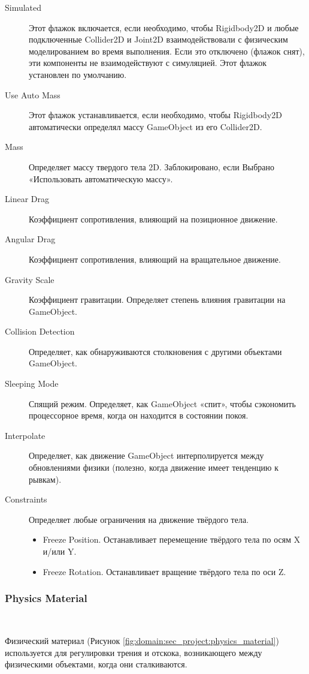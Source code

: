 \begin{description}
	\item[Simulated] Этот флажок включается, если необходимо, чтобы Rigidbody2D и любые подключенные Collider2D и Joint2D взаимодействовали с физическим моделированием во время выполнения. Если это отключено (флажок снят), эти компоненты не взаимодействуют с симуляцией. Этот флажок установлен по умолчанию.
	\item[Use Auto Mass] Этот флажок устанавливается, если необходимо, чтобы Rigidbody2D автоматически определял массу GameObject из его Collider2D.
	\item[Mass] Определяет массу твердого тела 2D. Заблокировано, если Выбрано «Использовать автоматическую массу».
	\item[Linear Drag] Коэффициент сопротивления, влияющий на позиционное движение.
	\item[Angular Drag] Коэффициент сопротивления, влияющий на вращательное движение.
	\item[Gravity Scale] Коэффициент гравитации. Определяет степень влияния гравитации на GameObject.
	\item[Collision Detection] Определяет, как обнаруживаются столкновения с другими объектами GameObject.
	\item[Sleeping Mode] Спящий режим. Определяет, как GameObject «спит», чтобы сэкономить процессорное время, когда он находится в состоянии покоя.
	\item[Interpolate] Определяет, как движение GameObject интерполируется между обновлениями физики (полезно, когда движение имеет тенденцию к рывкам).
	\item[Constraints] Определяет любые ограничения на движение твёрдого тела.
	\begin{itemize}
		\item Freeze Position. Останавливает перемещение твёрдого тела по осям X и/или Y.
		\item Freeze Rotation. Останавливает вращение твёрдого тела по оси Z.
	\end{itemize}
\end{description}



\subsubsection{Physics Material}~

Физический материал (Рисунок \ref{fig:domain:sec_project:physics_material}) используется для регулировки трения и отскока, возникающего между физическими объектами, когда они сталкиваются.

